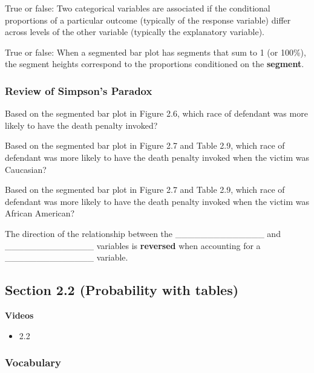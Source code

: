 \documentclass[
]{report}
\providecommand{\tightlist}{%
  \setlength{\itemsep}{0pt}\setlength{\parskip}{0pt}}
\newcommand{\rgs}{\vspace{12pt}} %
\begin{document}
True or false: Two categorical variables are associated if the conditional proportions of a particular outcome (typically of the response variable) differ across levels of the other variable (typically the explanatory variable).

True or false: When a segmented bar plot has segments that sum to 1 (or 100\%), the segment heights correspond to the proportions conditioned on the \textbf{segment}.

\hypertarget{review-of-simpsons-paradox}{%
\subsubsection*{Review of Simpson's Paradox}\label{review-of-simpsons-paradox}}

Based on the segmented bar plot in Figure 2.6, which race of defendant was more likely to have the death penalty invoked?
\rgs

Based on the segmented bar plot in Figure 2.7 and Table 2.9, which race of defendant was more likely to have the death penalty invoked when the victim was Caucasian?
\rgs

Based on the segmented bar plot in Figure 2.7 and Table 2.9, which race of defendant was more likely to have the death penalty invoked when the victim was African American?
\rgs

The direction of the relationship between the \_\_\_\_\_\_\_\_\_\_\_\_\_\_
and \_\_\_\_\_\_\_\_\_\_\_\_\_\_ variables is \textbf{reversed} when accounting for
a \_\_\_\_\_\_\_\_\_\_\_\_\_\_ variable.
\rgs

\hypertarget{section-2.2-probability-with-tables}{%
\subsection*{Section 2.2 (Probability with tables)}\label{section-2.2-probability-with-tables}}


\textbf{Videos}

\begin{itemize}
\tightlist
\item
  2.2
\end{itemize}


\hypertarget{vocabulary-4}{%
\subsubsection*{Vocabulary}\label{vocabulary-4}}
\end{document}
